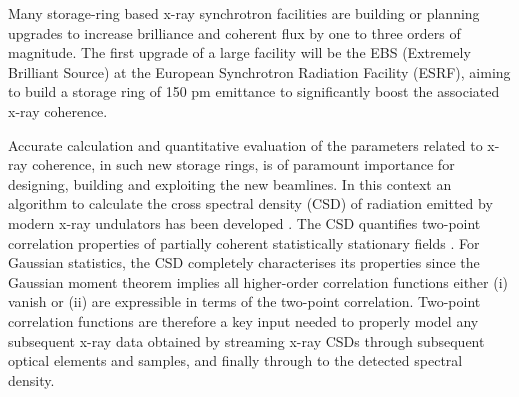 \documentclass[%
 reprint,
 amsmath,amssymb,
 aps,
]{revtex4-1}
\begin{document}
Many storage-ring based x-ray synchrotron facilities are building or planning upgrades to increase brilliance and coherent flux by one to three orders of magnitude.  The first upgrade of a large facility will be the EBS (Extremely Brilliant Source) \cite{orangebook} at the European Synchrotron Radiation Facility (ESRF), aiming to build a storage ring of 150 pm emittance to significantly boost the associated x-ray coherence.

Accurate calculation and quantitative evaluation of the parameters related to x-ray coherence, in such new storage rings, is of paramount importance for designing, building and exploiting the new beamlines. In this context an algorithm to calculate the cross spectral density (CSD) of radiation emitted by modern x-ray undulators has been developed \cite{glass}.  The CSD quantifies two-point correlation properties of partially coherent statistically stationary fields \cite{Wolf1982,mandel_wolf}.  For Gaussian statistics, the CSD completely characterises its properties since the Gaussian moment theorem implies all higher-order correlation functions either (i) vanish or (ii) are expressible in terms of the two-point correlation.  Two-point correlation functions are therefore a key input needed to properly model any subsequent x-ray data obtained by streaming x-ray CSDs through subsequent optical elements and samples, and finally through to the detected spectral density.  
\end{document}
